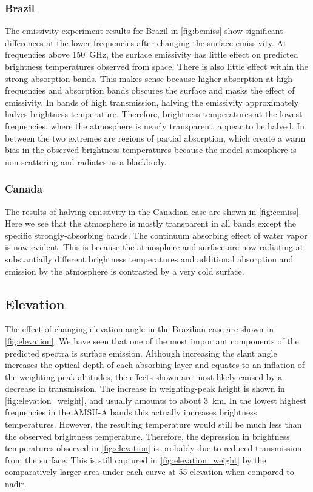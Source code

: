 \documentclass[twocol]{ametsoc}
\begin{document}
\subsubsection{Brazil}

The emissivity experiment results for Brazil in \autoref{fig:bemiss} show significant differences at the lower frequencies after changing the surface emissivity.
At frequencies above 150~GHz, the surface emissivity has little effect on predicted brightness temperatures observed from space.
There is also little effect within the strong absorption bands.
This makes sense because higher absorption at high frequencies and absorption bands obscures the surface and masks the effect of emissivity.
In bands of high transmission, halving the emissivity approximately halves brightness temperature.
Therefore, brightness temperatures at the lowest frequencies, where the atmosphere is nearly transparent, appear to be halved.
In between the two extremes are regions of partial absorption, which create a warm bias in the observed brightness temperatures because the model atmosphere is non-scattering and radiates as a blackbody.

\subsubsection{Canada}

The results of halving emissivity in the Canadian case are shown in \autoref{fig:cemiss}.
Here we see that the atmosphere is mostly transparent in all bands except the specific strongly-absorbing bands.
The continuum absorbing effect of water vapor is now evident.
This is because the atmosphere and surface are now radiating at substantially different brightness temperatures and additional absorption and emission by the atmosphere is contrasted by a very cold surface. 

\subsection{Elevation}

The effect of changing elevation angle in the Brazilian case are shown in \autoref{fig:elevation}.
We have seen that one of the most important components of the predicted spectra is surface emission.
Although increasing the slant angle increases the optical depth of each absorbing layer and equates to an inflation of the weighting-peak altitudes, the effects shown are most likely caused by a decrease in transmission.
The increase in weighting-peak height is shown in \autoref{fig:elevation_weight}, and usually amounts to about 3~km.
In the lowest highest frequencies in the AMSU-A bands this actually increases brightness temperatures.
However, the resulting temperature would still be much less than the observed brightness temperature.
Therefore, the depression in brightness temperatures observed in \autoref{fig:elevation} is probably due to reduced transmission from the surface.
This is still captured in \autoref{fig:elevation_weight} by the comparatively larger area under each curve at 55\degree{} elevation when compared to nadir.
\end{document}
